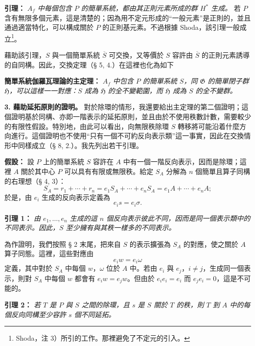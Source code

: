 \documentclass[11pt]{article}
\providecommand{\srcspaced}[1]{#1}
\providecommand{\glqq}{“}
\providecommand{\grqq}{”}
\providecommand{\Gcal}{\mathfrak G}
\begin{document}
\noindent\textbf{\srcspaced{引理：}} \emph{\(A_f\) 中每個包含 \(P\) 的簡單系統，都由其正則元素所成的群 \(H^*\) 生成。} 若 \(P\) 含有無限多個元素，這是清楚的；因為用不定元形成的\glqq{}一般元素\grqq{}是正則的，並且通過適當特化，可以構成關於 \(P\) 的正則基元素。不過根據 Shoda，該引理一般成立\footnote{Shoda，注 3）所引的工作。那裡避免了不定元的引入。}。

藉助該引理，\(S\) 與一個簡單系統 \(\overline S\) 可交換，又等價於 \(S\) 容許由 \(\overline S\) 的正則元素誘導的自同構。因此，交換定理（§ 5, 4.）在這裡也化為如下

\noindent\textbf{\srcspaced{簡單系統伽羅瓦理論的主定理：}} \emph{\(A_f\) 中包含 \(P\) 的簡單系統 \(S\)，同 \(\Gcal\) 的簡單閉子群 \(\mathfrak H\)，可以這樣一一對應：\(S\) 成為 \(\mathfrak H\) 的全不變範圍，而 \(\mathfrak H\) 成為 \(S\) 的全不變群。}

\noindent\textbf{\srcspaced{3. 藉助延拓原則的證明。}}
對於除環的情形，我還要給出主定理的第二個證明；這個證明基於同構、亦即一階表示的延拓原則，並且由於不使用秩數計數，需要較少的有限性假設。特別地，由此可以看出，向無限秩除環 \(S\) 轉移將可能沿着什麼方向進行。這個證明也不使用“只有一個不可約反向表示類”這一事實，因此在交換情形中同樣成立（§ 8, 2.）。我先列出若干引理。

\noindent\textbf{\srcspaced{假設：}} 設 \(P\) 上的簡單系統 \(S\) 容許在 \(A\) 中有一個一階反向表示，因而是除環；這裡 \(A\) 關於其中心 \(P\) 可以具有有限或無限秩。給定 \(S_A\) 分解為 \(n\) 個簡單且算子同構的右理想（§ 4, 3）：
\[
        S_A=r_1+\cdots+r_n
            =e_1S_A+\cdots+e_nS_A
            =e_1A+\cdots+e_nA ;
\]
於是，由 \(e_i\) 生成的反向表示定義為
\[
        e_i s=e_i\sigma .
\]

\noindent\textbf{\srcspaced{引理 1：}} \emph{由 \(e_1,\ldots,e_n\) 生成的這 \(n\) 個反向表示彼此不同，因而是同一個表示類中的不同表示。因此，\(S\) 至少擁有與其秩一樣多的不同表示。}

為作證明，我們按照 § 2 末尾，把來自 \(S\) 的表示擴張為 \(S_A\) 的對應，使之關於 \(A\) 算子同態。這裡，這些對應由
\[
        e_i w=e_i\omega
\]
定義，其中對於 \(S_A\) 中每個 \(w\)，\(\omega\) 位於 \(A\) 中。若由 \(e_i\) 與 \(e_j\)，\(i\ne j\)，生成同一個表示，則對 \(S_A\) 中每個 \(w\) 都會有 \(e_iw=e_jw\)。但由於 \(e_ie_i=e_i\) 而 \(e_je_i=0\)，這是不可能的。

\noindent\textbf{\srcspaced{引理 2：}} \emph{若 \(T\) 是 \(P\) 與 \(S\) 之間的除環，且 \(s\) 是 \(S\) 關於 \(T\) 的秩，則 \(T\) 到 \(A\) 中的每個反向同構至少容許 \(s\) 個不同延拓。}
\end{document}
